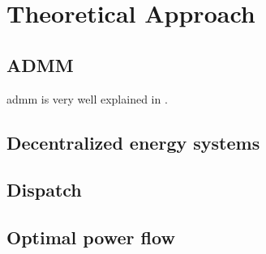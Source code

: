 \section{Theoretical Approach}

\subsection{ADMM}

\gls{admm} is very well explained in \citet{Boyd-2010-DistributedOptimizationStatistical}.

\subsection{Decentralized energy systems}

\subsection{Dispatch}

\subsection{Optimal power flow}

